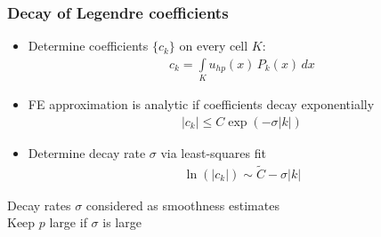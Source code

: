 \begin{frame}
\frametitle{Decay of Legendre coefficients}

\begin{itemize}
\item Determine coefficients $\{c_k\}$ on every cell $K$:
  \begin{align*}
  c_k = \int\limits_K u_{hp}(x) \, P_k(x) \, dx
  \end{align*}
  
\item FE approximation is analytic if coefficients decay exponentially \cite{eibner2007}
  \begin{align*}
  |c_k| \leq C \exp\left( - \sigma |k| \right)
  \end{align*}
  
\item Determine decay rate $\sigma$ via least-squares fit
  \begin{align*}
  \ln(|c_k|) \sim \tilde{C} - \sigma |k|
  \end{align*}
\end{itemize}

\vspace{-1em}
\begin{block}{\vspace{-1em}}
\centering
Decay rates $\sigma$ considered as smoothness estimates \\
Keep $p$ large if $\sigma$ is large
\end{block}
\vspace{1em}
\end{frame}





